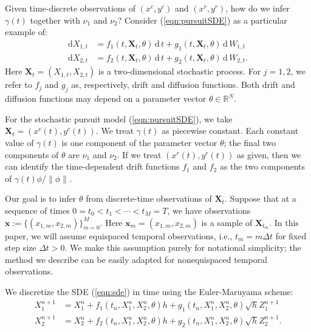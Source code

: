 \documentclass[graybox]{svmult}
\begin{document}
Given time-discrete observations of
$(x^{c},y^{c})$ and $(x^{r},y^{r})$, how do we infer $\gamma(t)$
together with $\nu_1$ and $\nu_2$?  Consider
(\ref{eqn:pursuitSDE}) as a particular example of:
\begin{subequations}
\label{eqn:sde}
\begin{align}
\mathrm{d}X_{1,t} &= f_1(t, \mathbf{X}_t, \theta) \, \mathrm{d} \, t + g_1(t, \mathbf{X}_t, \theta) \, \mathrm{d} \, W_{1,t} \\
\mathrm{d}X_{2,t} &= f_2(t, \mathbf{X}_t, \theta)\, \mathrm{d} \, t + g_2(t, \mathbf{X}_t, \theta) \, \mathrm{d} \, W_{2,t}.
\end{align}
\end{subequations}
Here $\mathbf{X}_t = (X_{1,t}, X_{2,t})$ is a two-dimensional
stochastic process. For $j=1, 2$, we refer to $f_j$ and $g_j$ as,
respectively, drift and diffusion functions.  Both
drift and diffusion functions may depend on a parameter vector
$\theta \in \mathbb{R}^{N}$.

For the stochastic pursuit model (\ref{eqn:pursuitSDE}), we take
$\mathbf{X}_t = (x^{c}(t), y^{c}(t))$.  We treat $\gamma(t)$ as
piecewise constant.  Each constant value of $\gamma(t)$ is one
component of the parameter vector $\theta$; the final two
components of $\theta$ are $\nu_1$ and $\nu_2$.  If we treat
$(x^{r}(t), y^{r}(t))$ as given, then we can identify the time-dependent drift
functions $f_1$ and $f_2$ as the two components of $ \gamma(t) \phi /
\| \phi \|$. 

Our goal is to infer $\theta$ from discrete-time observations of $\mathbf{X}_t$.  Suppose that at a sequence of times $0 = t_0 < t_1 < \cdots < t_M = T$, we have observations $\mathbf{x} := \{({x}_{1,m},{x}_{2,m})\}_{m=0}^M$.  Here $\mathbf{x}_m = ({x}_{1,m},{x}_{2,m})$ is a sample of $\mathbf{X}_{t_m}$.  In this paper, we will assume equispaced temporal observations, i.e., $t_m = m \Delta t$ for fixed step size $\Delta t > 0$.  We make this assumption purely for notational simplicity; the method we describe can be easily adapted for nonequispaced temporal observations.

We discretize the SDE (\ref{eqn:sde}) in time using the Euler-Maruyama scheme:
\begin{subequations}
\label{eqn:discretesde}
\begin{align}
X_1^{n+1} &= X_1^{n} + f_1(t_n, X_1^n, X_2^n, \theta)h + g_1(t_n, X_1^n, X_2^n,  \theta) \sqrt{h} Z_1^{n+1} \\
X_2^{n+1} &= X_2^{n} + f_2(t_n, X_1^n, X_2^n,\theta)h + g_2(t_n, X_1^n, X_2^n,\theta) \sqrt{h} Z_2^{n+1}.
\end{align}
\end{subequations}
\end{document}
